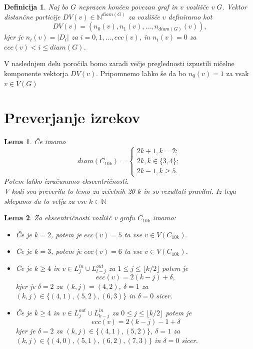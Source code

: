 \documentclass[a4paper, 12pt]{article}
\newtheorem{definicija}{Definicija}[section]
\newtheorem{lema}{Lema}[section]
\begin{document}
\begin{definicija}
    Naj bo $G$ neprazen končen povezan graf in $v$ vozlišče v $G$. Vektor distančne particije $DV(v) \in \mathbb{N}^{diam(G)}$ za vozlišče $v$
    definiramo kot
    $$
    DV(v) = (n_{0}(v), n_{1}(v), \dots , n_{diam(G)}(v)),
    $$
    kjer je $n_{i}(v) = |D_{i}|$ za $i=0,1, \dots , ecc(v)$, in $n_{i}(v) = 0$ za $ecc(v) < i \leq diam(G)$.
\end{definicija}

V naslednjem delu poročila bomo zaradi večje preglednosti izpustili ničelne komponente vektorja $DV(v)$. Pripomnemo lahko še 
da bo $n_{0}(v) = 1$ za vsak $v \in V(G)$

\section{Preverjanje izrekov}

\begin{lema}
    Če imamo 
    $$
    diam(C_{10k}) = \begin{cases}
                    2k+1, k=2;\\
                    2k, k \in \{3,4\};\\
                    2k-1, k \geq 5.

                    \end{cases}
    $$
    Potem lahko izračunamo ekscentričnosti. \\
    V kodi sva preverila to lemo za zečetnih 20 $k$ in so rezultati pravilni. Iz tega sklepamo da to velja za vse $k \in \mathbb{N}$
\end{lema}

\begin{lema}
    Za ekscentričnosti vozlišč v grafu $C_{10k}$ imamo:
    \begin{itemize}
        \item Če je $k=2$, potem je $ecc(v) = 5$ ta vse $v \in V(C_{10k})$.
        \item Če je $k=3$, potem je $ecc(v) = 6$ ta vse $v \in V(C_{10k})$.
        \item Če je $k \geq 4$ in $v \in L_{j}^{in} \cup L_{l-j}^{out}$ za $1 \leq j \leq \lfloor k/2 \rfloor$ potem je $$ecc(v) = 2(k-j) + \delta,$$
              kjer je $\delta = 2 $ za $(k,j) = (4,2)$, $\delta = 1$ za $(k , j) \in \{(4,1), (5,2), (6,3) \}$ in $\delta = 0$ sicer.
        \item Če je $k \geq 4$ in $v \in L_{j}^{out} \cup L_{k-j}^{in}$ za $0 \leq j \leq \lfloor k/2 \rfloor$ potem je $$ecc(v) = 2(k-j) - 1 +\delta$$
        kjer je $\delta = 2 $ za $(k,j) \in \{(4,1), (5,2)\}$, $\delta = 1$ za $(k , j) \in \{(4,0), (5,1), (6,2), (7,3) \}$ in $\delta = 0$ sicer.
    \end{itemize}
\end{lema}
\end{document}
